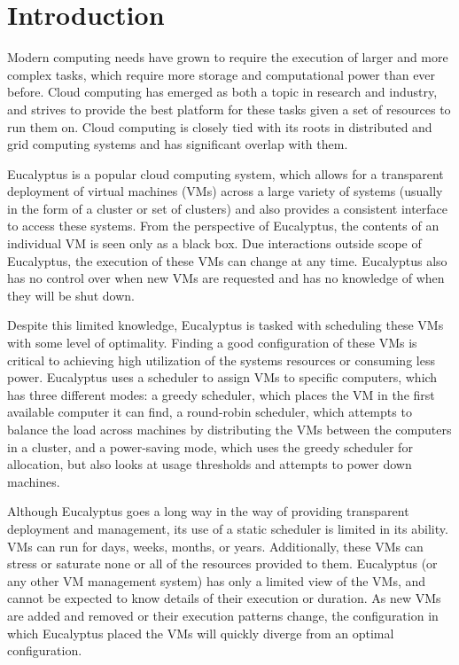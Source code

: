 \section{Introduction}
\label{sec:intro}

   Modern computing needs have grown to require the execution of larger and more complex tasks, which require more storage and computational power than ever before.  Cloud computing has emerged as both a topic in research and industry, and strives to provide the best platform for these tasks given a set of resources to run them on.  Cloud computing is closely tied with its roots in distributed and grid computing systems and has significant overlap with them.  

  Eucalyptus is a popular cloud computing system, which allows for a transparent deployment of virtual machines (VMs) across a large variety of systems (usually in the form of a cluster or set of clusters) and also provides a consistent interface to access these systems.  From the perspective of Eucalyptus, the contents of an individual VM is seen only as a black box.  Due interactions outside scope of Eucalyptus, the execution of these VMs can change at any time.  Eucalyptus also has no control over when new VMs are requested and has no knowledge of when they will be shut down.

Despite this limited knowledge, Eucalyptus is tasked with scheduling these VMs with some level of optimality.  Finding a good configuration of these VMs is critical to achieving high utilization of the systems resources or consuming less power.  Eucalyptus uses a scheduler to assign VMs to specific computers, which has three different modes: a greedy scheduler, which places the VM in the first available computer it can find, a round-robin scheduler, which attempts to balance the load across machines by distributing the VMs between the computers in a cluster, and a power-saving mode, which uses the greedy scheduler for allocation, but also looks at usage thresholds and attempts to power down machines.

  Although Eucalyptus goes a long way in the way of providing transparent deployment and management, its use of a static scheduler is limited in its ability.  VMs can run for days, weeks, months, or years.  Additionally, these VMs can stress or saturate none or all of the resources provided to them.  Eucalyptus (or any other VM management system) has only a limited view of the VMs, and cannot be expected to know details of their execution or duration.  As new VMs are added and removed or their execution patterns change, the configuration in which Eucalyptus placed the VMs will quickly diverge from an optimal configuration.

